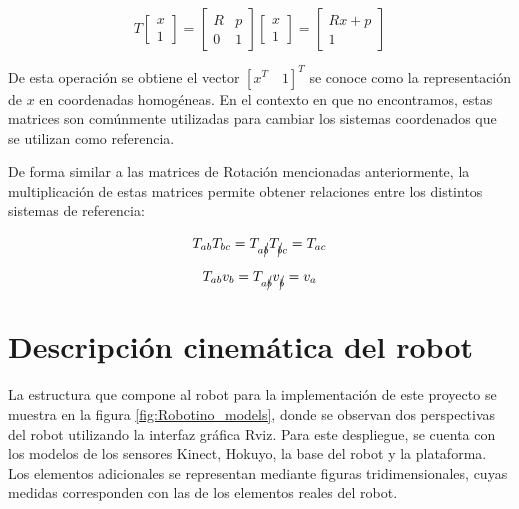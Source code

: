 \begin{equation*}
    T \begin{bmatrix}
        x\\1
    \end{bmatrix} = 
    \begin{bmatrix}
	R & p\\
	0 & 1 
	\end{bmatrix}
    \begin{bmatrix}
	x\\
	1 
	\end{bmatrix}=
    \begin{bmatrix}
	Rx + p\\
    1 
	\end{bmatrix}
\end{equation*}

De esta operación se obtiene el vector $ \left[x^{T}\quad 1\right]^{T}$ se conoce como la representación de $x$ en coordenadas homogéneas. En el contexto en que no encontramos, estas matrices son comúnmente utilizadas para cambiar los sistemas coordenados que se utilizan como referencia. 

De forma similar a las matrices de Rotación mencionadas anteriormente, la multiplicación de estas matrices permite obtener relaciones entre los distintos sistemas de referencia:

\begin{equation*}
    T_{ab}T_{bc} = T_{a\cancel{b}}T_{\cancel{b}c}=T_{ac}
\end{equation*}

\begin{equation*}
    T_{ab}v_{b} = T_{a\cancel{b}}v_{\cancel{b}}=v_{a}
\end{equation*}

\section{Descripción cinemática del robot}

La estructura que compone al robot para la implementación de este proyecto se muestra en la figura \ref{fig:Robotino_models}, donde se observan dos perspectivas del robot utilizando la interfaz gráfica Rviz. Para este despliegue, se cuenta con los modelos de los sensores Kinect, Hokuyo, la base del robot y la plataforma. Los elementos adicionales se representan mediante figuras tridimensionales, cuyas medidas corresponden con las de los elementos reales del robot.

